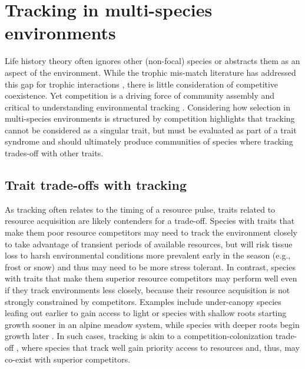 \documentclass[11pt,letterpaper]{article}
\begin{document}
\section{Tracking in multi-species environments} 
Life history theory often ignores other (non-focal) species or abstracts them as an aspect of the environment. While the trophic mis-match literature has addressed this gap for trophic interactions \citep{Visser:2005bg,vissergienapp2019}, there is little consideration of competitive coexistence. Yet competition is a driving force of community assembly \citep{Hutchinson:1959xi,Chesson:2000vd} and critical to understanding environmental tracking \citep{metcalf2015}. Considering how selection in multi-species environments is structured by competition highlights that tracking cannot be considered as a singular trait, but must be evaluated as part of a trait syndrome \citep[or mosaic of traits,][]{Ghalambor2007} and should ultimately produce communities of species where tracking trades-off with other traits.

\subsection{Trait trade-offs with tracking} 

As tracking often relates to the timing of a resource pulse, traits related to resource acquisition are likely contenders for a trade-off. Species with traits that make them poor resource competitors may need to track the environment closely to take advantage of transient periods of available resources, but will risk tissue loss to harsh environmental conditions more prevalent early in the season (e.g., frost or snow) and thus may need to be more stress tolerant. In contrast, species with traits that make them superior resource competitors may perform well even if they track environments less closely, because their resource acquisition is not strongly constrained by competitors. Examples include under-canopy species leafing out earlier to gain access to light \citep{heberling2019} or species with shallow roots starting growth sooner in an alpine meadow system, while species with deeper roots begin growth later \citep{Zhu2016BioLetters}. In such cases, tracking is akin to a competition-colonization trade-off \citep{Amarasekare:2003tq}, where species that track well gain priority access to resources and, thus, may co-exist with superior competitors. 

\end{document}

